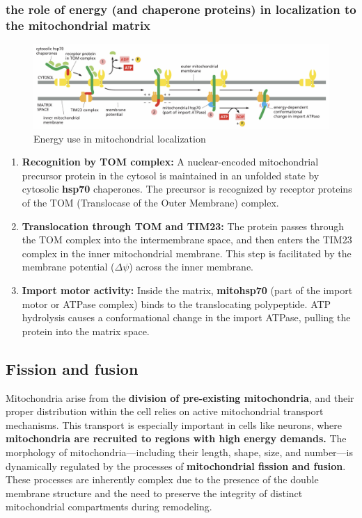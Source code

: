 \documentclass[../main.tex]{subfiles}
\begin{document}
\subsubsection{the role of energy (and chaperone proteins) in localization to the mitochondrial matrix}
\begin{figure}[H]
    \centering
    \includegraphics[width=\linewidth]{Energy.png}
    \caption{Energy use in mitochondrial localization}
    \label{fig:enter-label}
\end{figure}
\begin{enumerate}
    \item \textbf{Recognition by TOM complex:} A nuclear-encoded mitochondrial precursor protein in the cytosol is maintained in an unfolded state by cytosolic  \textbf{\gls{hsp70}} chaperones. The precursor is recognized by receptor proteins of the TOM (Translocase of the Outer Membrane) complex.
    
    \item \textbf{Translocation through TOM and TIM23:} The protein passes through the TOM complex into the intermembrane space, and then enters the TIM23 complex in the inner mitochondrial membrane. This step is facilitated by the membrane potential (\( \Delta \psi \)) across the inner membrane.
    
    \item \textbf{Import motor activity:} Inside the matrix, \textbf{\gls{mitohsp70}} (part of the import motor or ATPase complex) binds to the translocating polypeptide. ATP hydrolysis causes a conformational change in the import ATPase, pulling the protein into the matrix space.
\end{enumerate}
\subsection{Fission and fusion}

Mitochondria arise from the\textbf{ division of pre-existing mitochondria}, and their proper distribution within the cell relies on active mitochondrial transport mechanisms. This transport is especially important in cells like neurons, where \textbf{mitochondria are recruited to regions with high energy demands.} The morphology of mitochondria—including their length, shape, size, and number—is dynamically regulated by the processes of \textbf{mitochondrial fission and fusion}. These processes are inherently complex due to the presence of the double membrane structure and the need to preserve the integrity of distinct mitochondrial compartments during remodeling.
\end{document}
